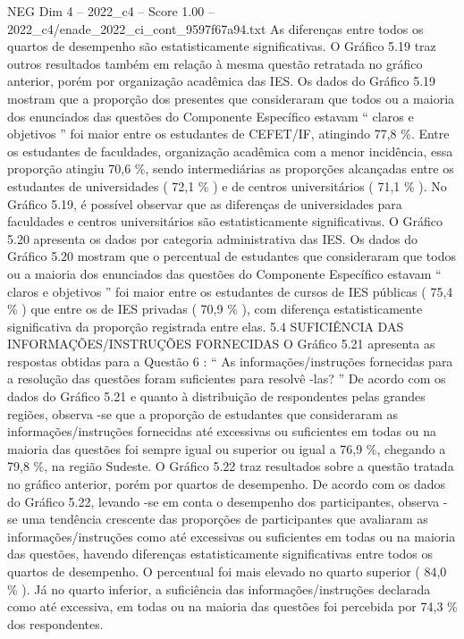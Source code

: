 \begin{textsample}{NEG Dim 4 – 2022\_c4 – Score 1.00 – 2022\_c4/enade\_2022\_ci\_cont\_9597f67a94.txt}
As diferenças entre todos os quartos de desempenho são estatisticamente significativas.
O Gráfico 5.19 traz outros resultados também em relação à mesma questão retratada no gráfico anterior, porém por organização acadêmica das IES.
Os dados do Gráfico 5.19 mostram que a proporção dos presentes que consideraram que todos ou a maioria dos enunciados das questões do Componente Específico estavam “ claros e objetivos ” foi maior entre os estudantes de CEFET/IF, atingindo 77,8 \%.
Entre os estudantes de faculdades, organização acadêmica com a menor incidência, essa proporção atingiu 70,6 \%, sendo intermediárias as proporções alcançadas entre os estudantes de universidades ( 72,1 \% ) e de centros universitários ( 71,1 \% ).
No Gráfico 5.19, é possível observar que as diferenças de universidades para faculdades e centros universitários são estatisticamente significativas.
O Gráfico 5.20 apresenta os dados por categoria administrativa das IES.
Os dados do Gráfico 5.20 mostram que o percentual de estudantes que consideraram que todos ou a maioria dos enunciados das questões do Componente Específico estavam “ claros e objetivos ” foi maior entre os estudantes de cursos de IES públicas ( 75,4 \% ) que entre os de IES privadas ( 70,9 \% ), com diferença estatisticamente significativa da proporção registrada entre elas. 5.4 SUFICIÊNCIA DAS INFORMAÇÕES/INSTRUÇÕES FORNECIDAS O Gráfico 5.21 apresenta as respostas obtidas para a Questão 6 : “ As informações/instruções fornecidas para a resolução das questões foram suficientes para resolvê -las? ” De acordo com os dados do Gráfico 5.21 e quanto à distribuição de respondentes pelas grandes regiões, observa -se que a proporção de estudantes que consideraram as informações/instruções fornecidas até excessivas ou suficientes em todas ou na maioria das questões foi sempre igual ou superior ou igual a 76,9 \%, chegando a 79,8 \%, na região Sudeste.
O Gráfico 5.22 traz resultados sobre a questão tratada no gráfico anterior, porém por quartos de desempenho.
De acordo com os dados do Gráfico 5.22, levando -se em conta o desempenho dos participantes, observa -se uma tendência crescente das proporções de participantes que avaliaram as informações/instruções como até excessivas ou suficientes em todas ou na maioria das questões, havendo diferenças estatisticamente significativas entre todos os quartos de desempenho.
O percentual foi mais elevado no quarto superior ( 84,0 \% ).
Já no quarto inferior, a suficiência das informações/instruções declarada como até excessiva, em todas ou na maioria das questões foi percebida por 74,3 \% dos respondentes.

\end{textsample}
